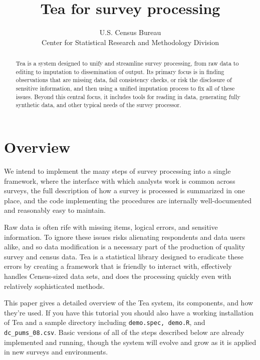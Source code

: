 \documentclass{article}
\begin{document}
\author{U.S. Census Bureau\\Center for Statistical Research and Methodology Division}
\title{Tea for survey processing}
\maketitle

\begin{abstract}
Tea is a system designed to unify and streamline survey processing, from raw data to
editing to imputation to dissemination of output. Its primary focus is in finding 
observations that are missing data, fail consistency checks, or risk the disclosure of
sensitive information, and then using a unified imputation process to fix all of these
issues. Beyond this central focus, it includes tools for reading in data, generating
fully synthetic data, and other typical needs of the survey processor.
\end{abstract}


\section{Overview}
{\sc We intend} to implement the many steps of survey processing into a single
framework, where the interface with which analysts work is common across surveys,
the full description of how a survey is processed is summarized in one place, and the
code implementing the procedures are internally well-documented and reasonably easy
to maintain.

Raw data is often rife with missing items, logical errors, and sensitive information. 
To ignore these issues risks alienating respondents and data users alike, and so data 
modification is a necessary part of the production of quality survey and census data. 
Tea is a statistical library designed to eradicate these errors by creating a framework 
that is friendly to interact with, effectively handles Census-sized data sets, and does 
the processing quickly even with relatively sophisticated methods.

This paper gives a detailed overview of the Tea system, its components, and how they're 
used. If you have this tutorial you should also have a working installation of Tea and 
a sample directory including {\tt demo.spec, demo.R}, and {\tt dc\_pums\_08.csv}. 
Basic versions of all of the steps described below are already implemented and running,
though the system will evolve and grow as it is applied in new surveys and environments.
\end{document}
